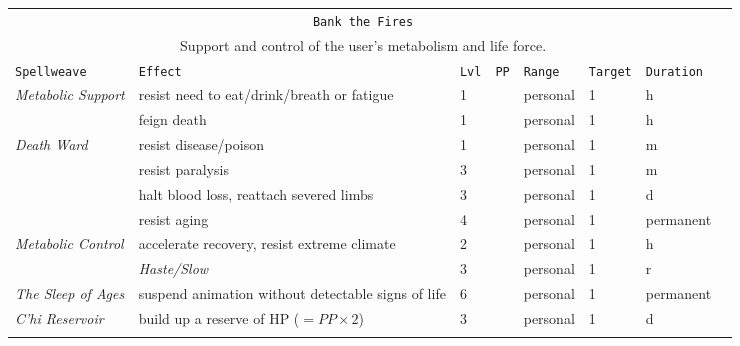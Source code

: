 \documentclass[10pt,a4paper]{article}
\begin{document}
\begin{table}[htbp!]
\begin{tabular}{llllllll}
  \multicolumn{7}{c}{\texttt{Bank the Fires}}\\
  \multicolumn{7}{c}{Support and control of the user's metabolism and life force.}\\
    \hline
    \texttt{Spellweave} & \texttt{Effect} & \texttt{Lvl} & \texttt{PP} & \texttt{Range} & \texttt{Target} & \texttt{Duration} \\
    \hline
    \multirow{1}{*}{\textit{Metabolic Support}} & resist need to eat/drink/breath or fatigue& 1 && personal & 1 & h\\
											    & feign death & 1 && personal & 1 & h\\
    \hline
    \multirow{1}{*}{\textit{Death Ward}} & resist disease/poison & 1 && personal & 1 & m\\
										 & resist paralysis & 3 && personal & 1 & m\\
										 & halt blood loss, reattach severed limbs & 3 && personal & 1 & d\\		
										 & resist aging & 4 && personal & 1 & permanent\\    
    \hline
    \multirow{1}{*}{\textit{Metabolic Control}} & accelerate recovery, resist extreme climate & 2 && personal & 1 & h\\
											    & \textit{Haste/Slow} & 3 && personal & 1 & r\\
    \hline
    \multirow{1}{*}{\textit{The Sleep of Ages}} & suspend animation without detectable signs of life & 6 && personal & 1 & permanent\\
    \hline
    \multirow{1}{*}{\textit{C'hi Reservoir}} & build up a reserve of HP ($=PP \times 2$) & 3 && personal & 1 & d\\
    &&&&&&\\
    
    
    

\end{tabular}
\end{table}
\end{document}
